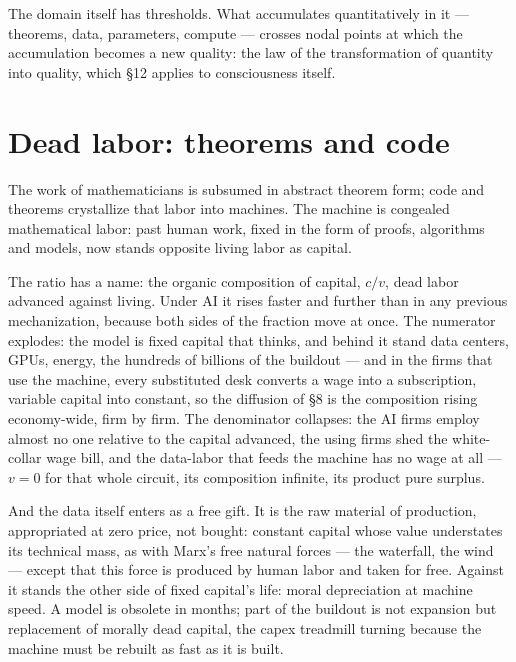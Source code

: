 \documentclass[11pt]{article}
\begin{document}
The domain itself has thresholds. What accumulates quantitatively in
it --- theorems, data, parameters, compute --- crosses nodal points at
which the accumulation becomes a new quality: the law of the
transformation of quantity into quality, which §12 applies to
consciousness itself.

\section{Dead labor: theorems and code}

The work of mathematicians is subsumed in abstract theorem form; code
and theorems crystallize that labor into machines. The machine is
congealed mathematical labor: past human work, fixed in the form of
proofs, algorithms and models, now stands opposite living labor as
capital.

The ratio has a name: the organic composition of capital, $c/v$, dead
labor advanced against living. Under AI it rises faster and further
than in any previous mechanization, because both sides of the fraction
move at once. The numerator explodes: the model is fixed capital that
thinks, and behind it stand data centers, GPUs, energy, the hundreds of
billions of the buildout --- and in the firms that use the machine,
every substituted desk converts a wage into a subscription, variable
capital into constant, so the diffusion of \S 8 is the composition
rising economy-wide, firm by firm. The denominator collapses: the AI
firms employ almost no one relative to the capital advanced, the using
firms shed the white-collar wage bill, and the data-labor that feeds the
machine has no wage at all --- $v = 0$ for that whole circuit, its
composition infinite, its product pure surplus.

And the data itself enters as a free gift. It is the raw material of
production, appropriated at zero price, not bought: constant capital
whose value understates its technical mass, as with Marx's free natural
forces --- the waterfall, the wind --- except that this force is
produced by human labor and taken for free. Against it stands the other
side of fixed capital's life: moral depreciation at machine speed. A
model is obsolete in months; part of the buildout is not expansion but
replacement of morally dead capital, the capex treadmill turning because
the machine must be rebuilt as fast as it is built.
\end{document}
